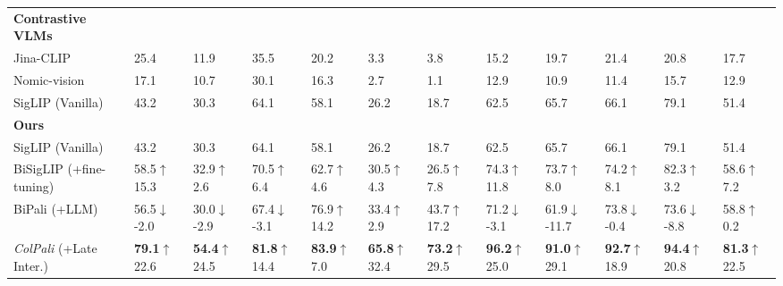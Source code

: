 \documentclass{article} %
\begin{document}
\begin{table}[ht]
{\begin{tabular}{ll@{\hskip 0.5em}l@{\hskip 0.5em}l@{\hskip 0.5em}l@{\hskip 0.5em}l@{\hskip 0.5em}l@{\hskip 0.5em}l@{\hskip 0.5em}l@{\hskip 0.5em}l@{\hskip 0.5em}l|@{\hskip 0.5em}l}
    \multicolumn{0}{l}{\textbf{Contrastive VLMs}}&&&&&&&&&&&\\
    Jina-CLIP & 25.4 & 11.9 & 35.5 & 20.2 & 3.3 & 3.8 & 15.2 & 19.7 & 21.4 & 20.8 & 17.7 \\
    Nomic-vision & 17.1 & 10.7 & 30.1 & 16.3 & 2.7 & 1.1 & 12.9 & 10.9 & 11.4 & 15.7 & 12.9\\
    SigLIP \tiny(Vanilla)& 43.2 & 30.3 & 64.1 & 58.1 & 26.2 & 18.7 & 62.5 & 65.7 & 66.1 & 79.1 & 51.4 \\
\midrule
\multicolumn{0}{l}{\textbf{Ours}}&&&&&&&&&&&\\
SigLIP \tiny(Vanilla)& 43.2 & 30.3 & 64.1 & 58.1 & 26.2 & 18.7 & 62.5 & 65.7 & 66.1 & 79.1 & 51.4 \\
BiSigLIP \tiny (+fine-tuning) & 58.5\textcolor{green!75!black}{\tiny $\uparrow$15.3} & 32.9\textcolor{green!75!black}{\tiny $\uparrow$2.6} & 70.5\textcolor{green!75!black}{\tiny $\uparrow$6.4} & 62.7\textcolor{green!75!black}{\tiny $\uparrow$4.6} & 30.5\textcolor{green!75!black}{\tiny $\uparrow$4.3} & 26.5\textcolor{green!75!black}{\tiny $\uparrow$7.8} & 74.3\textcolor{green!75!black}{\tiny $\uparrow$11.8} & 73.7\textcolor{green!75!black}{\tiny $\uparrow$8.0} & 74.2\textcolor{green!75!black}{\tiny $\uparrow$8.1} & 82.3\textcolor{green!75!black}{\tiny $\uparrow$3.2} & 58.6\textcolor{green!75!black}{\tiny $\uparrow$7.2}\\

BiPali \tiny (+LLM) & 56.5\textcolor{red!75!black}{\tiny $\downarrow$-2.0} & 30.0\textcolor{red!75!black}{\tiny $\downarrow$-2.9} & 67.4\textcolor{red!75!black}{\tiny $\downarrow$-3.1} & 76.9\textcolor{green!75!black}{\tiny $\uparrow$14.2} & 33.4\textcolor{green!75!black}{\tiny $\uparrow$2.9} & 43.7\textcolor{green!75!black}{\tiny $\uparrow$17.2} & 71.2\textcolor{red!75!black}{\tiny $\downarrow$-3.1} & 61.9\textcolor{red!75!black}{\tiny $\downarrow$-11.7} & 73.8\textcolor{red!75!black}{\tiny $\downarrow$-0.4} & 73.6\textcolor{red!75!black}{\tiny $\downarrow$-8.8} & 58.8\textcolor{green!75!black}{\tiny $\uparrow$0.2}\\
\textit{ColPali} \tiny (+Late Inter.) & \textbf{79.1}\textcolor{green!75!black}{\tiny $\uparrow$22.6} & \textbf{54.4}\textcolor{green!75!black}{\tiny $\uparrow$24.5} & \textbf{81.8}\textcolor{green!75!black}{\tiny $\uparrow$14.4} & \textbf{83.9}\textcolor{green!75!black}{\tiny $\uparrow$7.0} & \textbf{65.8}\textcolor{green!75!black}{\tiny $\uparrow$32.4} & \textbf{73.2}\textcolor{green!75!black}{\tiny $\uparrow$29.5} & \textbf{96.2}\textcolor{green!75!black}{\tiny $\uparrow$25.0} & \textbf{91.0}\textcolor{green!75!black}{\tiny $\uparrow$29.1} & \textbf{92.7}\textcolor{green!75!black}{\tiny $\uparrow$18.9} & \textbf{94.4}\textcolor{green!75!black}{\tiny $\uparrow$20.8} & \textbf{81.3}\textcolor{green!75!black}{\tiny $\uparrow$22.5}\\


\end{tabular}}
\end{table}
\end{document}
